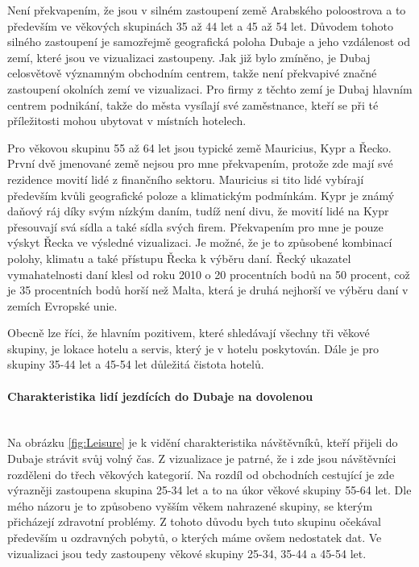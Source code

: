 \documentclass[czech,BP]{thesiskiv}
\begin{document}
Není překvapením, že jsou v silném zastoupení země Arabského poloostrova a to především ve věkových skupinách 35 až 44 let a 45 až 54 let. Důvodem tohoto silného zastoupení je samozřejmě geografická poloha Dubaje a jeho vzdálenost od zemí, které jsou ve vizualizaci zastoupeny. Jak již bylo zmíněno, je Dubaj celosvětově významným obchodním centrem, takže není překvapivé značné zastoupení okolních zemí ve vizualizaci. Pro firmy z těchto zemí je Dubaj hlavním centrem podnikání, takže do města vysílají své zaměstnance, kteří se při té příležitosti mohou ubytovat v místních hotelech.


Pro věkovou skupinu 55 až 64 let jsou typické země Mauricius, Kypr a Řecko. První dvě jmenované země nejsou pro mne překvapením, protože zde mají své rezidence movití lidé z finančního sektoru. Mauricius si tito lidé vybírají především kvůli geografické poloze a klimatickým podmínkám. Kypr je známý daňový ráj díky svým nízkým daním, tudíž není divu, že movití lidé na Kypr přesouvají svá sídla a také sídla svých firem. Překvapením pro mne je pouze výskyt Řecka ve výsledné vizualizaci. Je možné, že je to způsobené kombinací polohy, klimatu a také přístupu Řecka k výběru daní. Řecký ukazatel vymahatelnosti daní klesl od roku 2010 o 20 procentních bodů na 50 procent, což je 35 procentních bodů horší než Malta, která je druhá nejhorší ve výběru daní v zemích Evropské unie.\cite{GreeceTaxes} 


Obecně lze říci, že hlavním pozitivem, které shledávají všechny tři věkové skupiny, je lokace hotelu a servis, který je v hotelu poskytován. Dále je pro skupiny 35-44 let a 45-54 let důležitá čistota hotelů.





\paragraph{Charakteristika lidí jezdících do Dubaje na dovolenou}
\mbox{}\\
Na obrázku \ref{fig:Leisure} je k vidění charakteristika návštěvníků, kteří přijeli do Dubaje strávit svůj volný čas. Z vizualizace je patrné, že i zde jsou návštěvníci rozděleni do třech věkových kategorií. Na rozdíl od obchodních cestující je zde výrazněji zastoupena skupina 25-34 let a to na úkor věkové skupiny 55-64 let. Dle mého názoru je to způsobeno vyšším věkem nahrazené skupiny, se kterým přicházejí zdravotní problémy. Z tohoto důvodu bych tuto skupinu očekával především u ozdravných pobytů, o kterých máme ovšem nedostatek dat. Ve vizualizaci jsou tedy zastoupeny věkové skupiny 25-34, 35-44 a 45-54 let.
\end{document}
